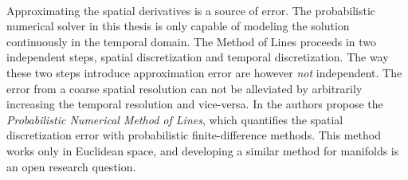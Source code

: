 \noindent%
\\Approximating the spatial derivatives is a source of error.  The probabilistic numerical solver in this thesis is only capable of modeling the solution continuously in the temporal domain. The Method of Lines proceeds in two independent steps, spatial discretization and temporal discretization. The way these two steps introduce approximation error are however \textit{not} independent. The error from a coarse spatial resolution can not be alleviated by arbitrarily increasing the temporal resolution and vice-versa. In \cite{pnmol} the authors propose the \textit{Probabilistic Numerical Method of Lines}, which quantifies the spatial discretization error with probabilistic finite-difference methods. This method works only in Euclidean space, and developing a similar method for manifolds is an open research question.

\ifdefined\COMPILINGFROMMAIN
\else    
    
\fi